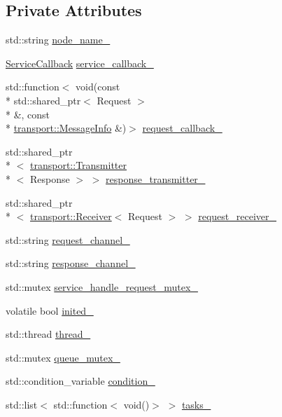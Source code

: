 \subsection*{Private Attributes}
\begin{DoxyCompactItemize}
\item 
std\-::string \hyperlink{classapollo_1_1cyber_1_1Service_a5d898e348220ba05c2f3997875ba2ec4}{node\-\_\-name\-\_\-}
\item 
\hyperlink{classapollo_1_1cyber_1_1Service_aedd53fb1d4b3636253ddcaba4dc896ab}{Service\-Callback} \hyperlink{classapollo_1_1cyber_1_1Service_a1fa2cb859454bfc73299470e36648ed3}{service\-\_\-callback\-\_\-}
\item 
std\-::function$<$ void(const \\*
std\-::shared\-\_\-ptr$<$ Request $>$\\*
 \&, const \\*
\hyperlink{classapollo_1_1cyber_1_1transport_1_1MessageInfo}{transport\-::\-Message\-Info} \&)$>$ \hyperlink{classapollo_1_1cyber_1_1Service_aad642b07ca0bac7ac1304ca1bb946eed}{request\-\_\-callback\-\_\-}
\item 
std\-::shared\-\_\-ptr\\*
$<$ \hyperlink{classapollo_1_1cyber_1_1transport_1_1Transmitter}{transport\-::\-Transmitter}\\*
$<$ Response $>$ $>$ \hyperlink{classapollo_1_1cyber_1_1Service_a3d0c840429b0e6d6fece389067b81757}{response\-\_\-transmitter\-\_\-}
\item 
std\-::shared\-\_\-ptr\\*
$<$ \hyperlink{classapollo_1_1cyber_1_1transport_1_1Receiver}{transport\-::\-Receiver}$<$ Request $>$ $>$ \hyperlink{classapollo_1_1cyber_1_1Service_a91f2641d8746e778f376b818e82e44fa}{request\-\_\-receiver\-\_\-}
\item 
std\-::string \hyperlink{classapollo_1_1cyber_1_1Service_a7d608dfbc0ca4ca0b049bd98a2414769}{request\-\_\-channel\-\_\-}
\item 
std\-::string \hyperlink{classapollo_1_1cyber_1_1Service_a3a69243428a43606ce347a23be39381f}{response\-\_\-channel\-\_\-}
\item 
std\-::mutex \hyperlink{classapollo_1_1cyber_1_1Service_a5c8fe530f3c6252b5ef3ec2c5e8e16be}{service\-\_\-handle\-\_\-request\-\_\-mutex\-\_\-}
\item 
volatile bool \hyperlink{classapollo_1_1cyber_1_1Service_a395a485575e4ef19615d8a1d9ce2ca01}{inited\-\_\-}
\item 
std\-::thread \hyperlink{classapollo_1_1cyber_1_1Service_a84cad59fd572efc77b81e5f1169d273a}{thread\-\_\-}
\item 
std\-::mutex \hyperlink{classapollo_1_1cyber_1_1Service_ae8f3674803541ccafb1946cd987d25e1}{queue\-\_\-mutex\-\_\-}
\item 
std\-::condition\-\_\-variable \hyperlink{classapollo_1_1cyber_1_1Service_af381d15ec5f1288c7ff214fb35362ce4}{condition\-\_\-}
\item 
std\-::list$<$ std\-::function$<$ void()$>$ $>$ \hyperlink{classapollo_1_1cyber_1_1Service_a6e223d7b18757cfeeee1618df40f2649}{tasks\-\_\-}
\end{DoxyCompactItemize}
